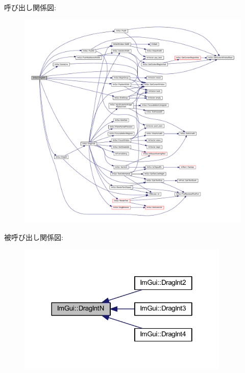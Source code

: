 呼び出し関係図\+:\nopagebreak
\begin{figure}[H]
\begin{center}
\leavevmode
\includegraphics[width=350pt]{namespace_im_gui_a2854d672b818938e6e9fb1de6de3dbe7_cgraph}
\end{center}
\end{figure}
被呼び出し関係図\+:\nopagebreak
\begin{figure}[H]
\begin{center}
\leavevmode
\includegraphics[width=286pt]{namespace_im_gui_a2854d672b818938e6e9fb1de6de3dbe7_icgraph}
\end{center}
\end{figure}
\mbox{\label{namespace_im_gui_a6aaacf92126bf45ce0e58348b5297a43}} 

